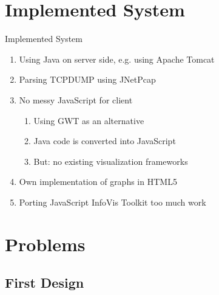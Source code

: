 \documentclass{beamer}
\begin{document}
\section{Implemented System}

\begin{frame}{Implemented System}
 \begin{enumerate}
  \item Using Java on server side, e.g. using Apache Tomcat
  \item Parsing TCPDUMP using JNetPcap
  \item No messy JavaScript for client
  \begin{enumerate}
    \item Using GWT as an alternative
    \item Java code is converted into JavaScript
    \item But: no existing visualization frameworks
  \end{enumerate}
  \item Own implementation of graphs in HTML5
  \item Porting JavaScript InfoVis Toolkit too much work
 \end{enumerate}
\end{frame}


\section{Problems}

\subsection{First Design}
\end{document}
